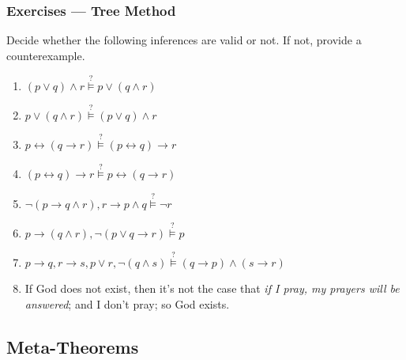 \documentclass[UTF8,11pt,colorlinks,compress,openany]{beamer}%
\begin{document}
\begin{frame}\frametitle{Exercises --- Tree Method}
Decide whether the following inferences are valid or not. If not, provide a counterexample.
\begin{enumerate}
	\item $(p\vee q)\wedge r\stackrel{?}{\vDash} p\vee(q\wedge r)$
	\item $p\vee(q\wedge r)\stackrel{?}{\vDash} (p\vee q)\wedge r$
	\item $p\leftrightarrow(q\to r)\stackrel{?}{\vDash}(p\leftrightarrow q)\to r$
	\item $(p\leftrightarrow q)\to r\stackrel{?}{\vDash}p\leftrightarrow(q\to r)$
	\item $\neg(p\to q\wedge r),r\to p\wedge q \stackrel{?}{\vDash}\neg r$
	\item $p\to(q\wedge r), \neg(p\vee q\to r)\stackrel{?}{\vDash}p$
	\item $p\to q, r\to s, p\vee r, \neg(q\wedge s)\stackrel{?}{\vDash}(q\to p)\wedge(s\to r)$
	\item If God does not exist, then it's not the case that \emph{if I pray, my prayers will be answered}; and I don't pray; so God exists.
\end{enumerate}
\end{frame}

\subsection{Meta-Theorems}
\end{document}
